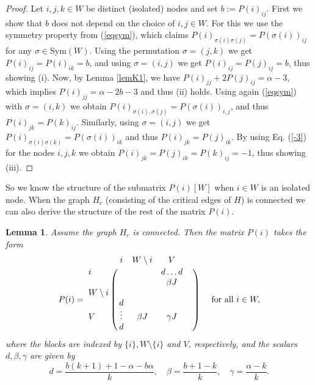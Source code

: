 \documentclass[11pt]{article}
\newtheorem{lemma}[theorem]{Lemma}
\numberwithin{equation}{section}
\begin{document}
\begin{proof}
Let $i,j,k \in W$ be  distinct (isolated) nodes and set $b:=P(i)_{ij}$. 
First we show that $b$ does not depend on the choice of $i,j\in W$. For this we use the symmetry property from (\ref{eqsym}), which claims 
$P(i)_{\sigma(i)\sigma(j)}=P(\sigma(i))_{ij}$ for any $\sigma\in \text{Sym}(W)$. Using the permutation  $\sigma=(j,k)$ we get $P(i)_{ij}=P(i)_{ik}=b$, and using  $\sigma=(i,j)$ we get $P(i)_{ij}=P(j)_{ij}=b$,
thus showing (i). Now, by Lemma \ref{lemK1}, we have $P(i)_{jj}+2P(j)_{ij}=\alpha-3$, which implies  $P(i)_{jj}=\alpha-2b-3$ and thus  (ii) holds.
Using again (\ref{eqsym}) with $\sigma=(i,k)$ we obtain $P(i)_{\sigma(i),\sigma(j)} =P(\sigma(i))_{i,j}$, and thus $P(i)_{jk}=P(k)_{ij}$. Similarly, using $\sigma=(i,j)$ we get $P(i)_{\sigma(i)\sigma(k)}=P(\sigma(i))_{ik}$ and thus 
$P(i)_{jk}=P(j)_{ik}$. By using Eq. (\ref{-3}) for the nodes $i,j,k$ we obtain $P(i)_{jk}=P(j)_{ik}=P(k)_{ij}=-1$, thus showing (iii).
\end{proof}

So we know the structure of the submatrix $P(i)[W]$ when $i\in W$ is an isolated node. When the graph $H_c$ (consisting of the critical edges of $H$) is connected we can also derive the structure of the rest of the matrix $P(i)$.

\begin{lemma}\label{struc-1}
Assume the graph $H_c$ is connected. %
Then the matrix $P(i)$  takes the form
    $$P(i) =\bordermatrix{& i & W\setminus{i}& V \cr
i & & & d\dots d\cr
& & & \beta J\cr
W\setminus{i} & & & \cr
& d & & \cr
V&\vdots &\beta J& \gamma J\cr
& d& &  & } \quad \text{ for  all }  i\in W,
$$
where the blocks are indexed by $\{i\}, W\setminus \{i\}$ and $V$, respectively, and the scalars $d,\beta,\gamma$ are given by
$$d=\dfrac{b(k+1)+1-\alpha-b\alpha}{k},
\quad \beta= \dfrac{b+1-k}{k},
\quad \gamma=\dfrac{\alpha-k}{k}.
$$
\end{lemma}
\end{document}
